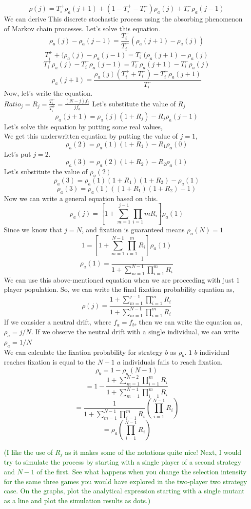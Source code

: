 \documentclass{article}
\newcommand{\cha}[1]{\textcolor{darkgreen}{(#1)}}
\begin{document}
\[\rho(j)=T_i^+\rho_a(j+1)+(1-T_i^+-T_i^-)\rho_a(j)+T_i^-\rho_a(j-1)\]
We can derive This discrete stochastic process using the absorbing phenomenon of Markov chain processes.
Let's solve this equation.
\[\rho_a(j)-\rho_a(j-1)=\frac{T_i^-}{T_i^+}(\rho_a(j+1)-\rho_a(j))\]
\[T_i^++(\rho_a(j)-\rho_a(j-1)=T_i^-(\rho_a(j+1)-\rho_a(j)\]
\[T_i^+\rho_a(j)-T_i^+\rho_a(j-1)=T_i^-\rho_a(j+1)-T_i^-\rho_a(j)\]
\[\rho_a(j+1)=\frac{\rho_a(j)(T_i^+ + T_i^-)-T_i^+\rho_a(j+1)}{T_i^-}\]
 Now, let's write the equation.\\
 $Ratio_j=R_j=\frac{T_i^-}{T_i^+}= \frac{(N-j)f_b}{jf_a}$
 Let's substitute the value of $R_j$
 \[\rho_a(j+1)={\rho_a(j)(1+R_j)-R_j\rho_a(j-1)}\]
 Let's solve this equation by putting some real values,\\
 We get this underwritten equation by putting the value of $j=1$,
 \[\rho_a(2)= \rho_a(1)(1+R_1)-R_1\rho_a(0)\]
 Let's put $j=2$.
 \[\rho_a(3)=\rho_a(2)(1+R_2)-R_2\rho_a(1)\]
 Let's substitute the value of $\rho_a(2)$
 \[\rho_a(3)=\rho_a(1)(1+R_1)(1+R_2)-\rho_a(1)\]
 \[\rho_a(3)=\rho_a(1)((1+R_1)(1+R_2)-1)\]
 Now we can write a general equation based on this.
 \[\rho_a(j)=\left[1+\sum_{m=1}^{j-1}\prod_{i=1}{m}R_i \right] \rho_a(1)\]
 Since we know that $j=N$, and fixation is guaranteed means $\rho_a(N)=1$
 \[1=\left[1+\sum_{m=1}^{N-1}\prod_{i=1}^{m} R_i\right]\rho_a(1)\]
 \[\rho_a(1)=\frac{1}{1+\sum_{m=1}^{N-1}\prod_{i=1}^{m}R_i}\]
 We can use this above-mentioned equation when we are proceeding with just $1$ player population.
 So, we can write the final fixation probability equation as,
 \[\rho(j)=\frac{1+\sum_{m=1}^{j-1}\prod_{i=1}^{m}R_i}{1+\sum_{m=1}^{N-1}\prod_{i=1}^{m}R_i}\]
 If we consider a neutral drift, where $f_a=f_b$, then we can write the equation as, $\rho_a={j}/{N}$.
 If we observe the neutral drift with a single individual, we can write $\rho_a=1/N$\cite{Traulsen2006}\\

 We can calculate the fixation probability for strategy $b$ as $\rho_b$. $1$ $b$ individual reaches fixation is equal to the $N-1$ $a$ individuals fails to reach fixation.
\[\rho_b=1-\rho_a(N-1)\]
\[=1-\frac{1 + \sum_{m=1}^{N-2} \prod_{i=1}^{m} R_i}{1 + \sum_{m=1}^{N-1} \prod_{i=1}^{m} R_i}\]
\[=\frac{1}{1+\sum_{m=1}^{N-1}\prod_{i=1}^{m}R_i}(\prod_{i=1}^{N-1}R_i)\]
\[=\rho_a(\prod_{i=1}^{N-1}R_i)\]


\cha{I like the use of $R_j$ as it makes some of the notations quite nice! Next, I would try to simulate the process by starting with a single player of a second strategy and $N-1$ of the first. See what happens when you change the selection intensity for the same three games you would have explored in the two-player two strategy case. On the graphs, plot the analytical expression starting with a single mutant as a line and plot the simulation results as dots.}
\end{document}
